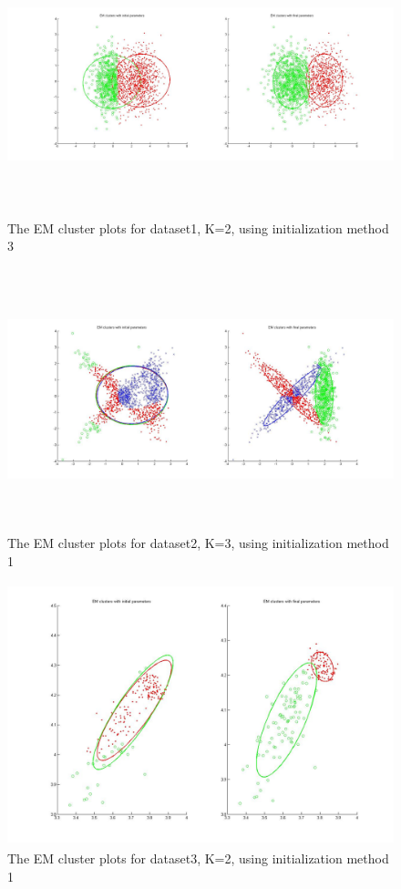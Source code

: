 \documentclass[11pt,psfig]{article}
\begin{document}
\begin{figure}[H]
\centering
\includegraphics[height=3in]{dataset1_EMclusterPlots.jpg}
\caption{The EM cluster plots for dataset1, K=2, using initialization method 3}
\end{figure}

\begin{figure}[H]
\centering
\includegraphics[height=3in]{dataset2_EMclusterPlots.jpg}
\caption{The EM cluster plots for dataset2, K=3, using initialization method 1}
\end{figure}

\begin{figure}[H]
\centering
\includegraphics[height=3in]{dataset3_EMclusterPlots.jpg}
\caption{The EM cluster plots for dataset3, K=2, using initialization method 1}
\end{figure}
\end{document}
